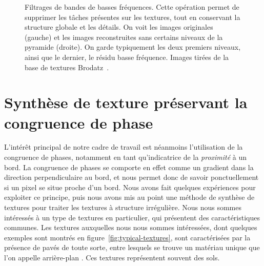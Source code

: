 \begin{figure}
    \caption[Filtrage de bandes de basses fréquences]{Filtrages de bandes de basses fréquences. Cette opération permet de supprimer les tâches présentes sur les textures, tout en conservant la structure globale et les détails. On voit les images originales (gauche) et les images reconstruites sans certains niveaux de la pyramide (droite). On garde typiquement les deux premiers niveaux, ainsi que le dernier, le résidu basse fréquence. Images tirées de la base de textures Brodatz~\cite{abdelmounaime_new_2013}.}
    \label{fig:filter-low-freq}
\end{figure}

\section{Synthèse de texture préservant la congruence de phase}

L'intérêt principal de notre cadre de travail est néanmoins l'utilisation de la congruence de phases, notamment en tant qu'indicatrice de la \textit{proximité} à un bord. La congruence de phases se comporte en effet comme un gradient dans la direction perpendiculaire au bord, et nous permet donc de savoir ponctuellement si un pixel se situe proche d'un bord. Nous avons fait quelques expériences pour exploiter ce principe, puis nous avons mis au point une méthode de synthèse de textures pour traiter les textures à structure irrégulière. Nous nous sommes intéressés à un type de textures en particulier, qui présentent des caractéristiques communes. Les textures auxquelles nous nous sommes intéressées, dont quelques exemples sont montrés en figure~\ref{fig:typical-textures}, sont caractérisées par la présence de pavés de toute sorte, entre lesquels se trouve un matériau unique que l'on appelle \og arrière-plan \fg. Ces textures représentent souvent des sols.

